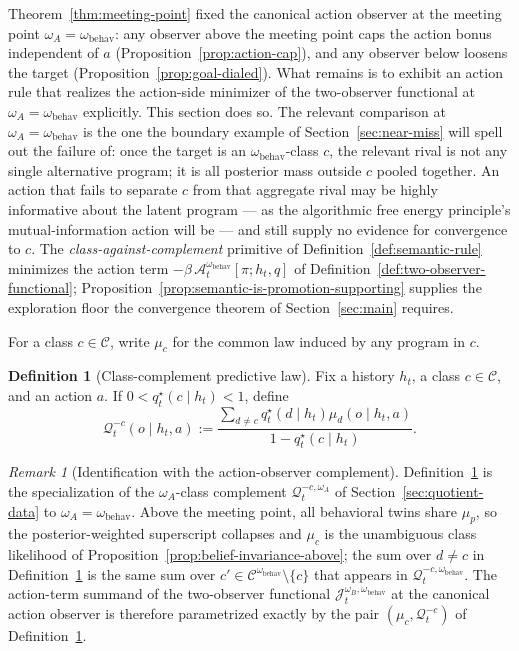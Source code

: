 \documentclass[11pt]{article}
\theoremstyle{definition}
\newtheorem{definition}[theorem]{Definition}
\theoremstyle{remark}
\newtheorem{remark}[theorem]{Remark}
\newcommand{\Ccal}{\mathcal{C}}
\newcommand{\Qcal}{\mathcal{Q}}
\begin{document}
Theorem~\ref{thm:meeting-point} fixed the canonical action observer at the meeting point $\omega_A=\omega_{\mathrm{behav}}$: any observer above the meeting point caps the action bonus independent of $a$ (Proposition~\ref{prop:action-cap}), and any observer below loosens the target (Proposition~\ref{prop:goal-dialed}). What remains is to exhibit an action rule that realizes the action-side minimizer of the two-observer functional at $\omega_A=\omega_{\mathrm{behav}}$ explicitly. This section does so. The relevant comparison at $\omega_A=\omega_{\mathrm{behav}}$ is the one the boundary example of Section~\ref{sec:near-miss} will spell out the failure of: once the target is an $\omega_{\mathrm{behav}}$-class $c$, the relevant rival is not any single alternative program; it is all posterior mass outside $c$ pooled together. An action that fails to separate $c$ from that aggregate rival may be highly informative about the latent program --- as the algorithmic free energy principle's mutual-information action will be --- and still supply no evidence for convergence to $c$. The \emph{class-against-complement} primitive of Definition~\ref{def:semantic-rule} minimizes the action term $-\beta\,\mathcal A_t^{\omega_{\mathrm{behav}}}[\pi;h_t,q]$ of Definition~\ref{def:two-observer-functional}; Proposition~\ref{prop:semantic-is-promotion-supporting} supplies the exploration floor the convergence theorem of Section~\ref{sec:main} requires.

For a class $c\in\Ccal$, write $\mu_c$ for the common law induced by any program in $c$.

\begin{definition}[Class-complement predictive law]
\label{def:class-complement}
Fix a history $h_t$, a class $c\in\Ccal$, and an action $a$. If $0<q_t^\star(c\mid h_t)<1$, define
\[
\Qcal_t^{-c}(o\mid h_t,a)
:=
\frac{\sum_{d\neq c} q_t^\star(d\mid h_t)\mu_d(o\mid h_t,a)}
{1-q_t^\star(c\mid h_t)}.
\]
\end{definition}

\begin{remark}[Identification with the action-observer complement]
\label{rem:class-complement-is-omega-behav}
Definition~\ref{def:class-complement} is the specialization of the $\omega_A$-class complement $\Qcal_t^{-c,\omega_A}$ of Section~\ref{sec:quotient-data} to $\omega_A=\omega_{\mathrm{behav}}$. Above the meeting point, all behavioral twins share $\mu_p$, so the posterior-weighted superscript collapses and $\mu_c$ is the unambiguous class likelihood of Proposition~\ref{prop:belief-invariance-above}; the sum over $d\neq c$ in Definition~\ref{def:class-complement} is the same sum over $c'\in\Ccal^{\omega_{\mathrm{behav}}}\setminus\{c\}$ that appears in $\Qcal_t^{-c,\omega_{\mathrm{behav}}}$. The action-term summand of the two-observer functional $\mathcal J_t^{\omega_B,\omega_{\mathrm{behav}}}$ at the canonical action observer is therefore parametrized exactly by the pair $(\mu_c,\Qcal_t^{-c})$ of Definition~\ref{def:class-complement}.
\end{remark}
\end{document}
